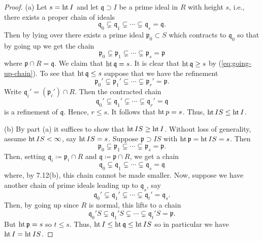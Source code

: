 \begin{proof}
(a) Let $s=\operatorname{ht} I$ and let $\mathfrak{q}\supset I$ be a prime ideal in $R$
with height $s$, i.e., there exists a proper chain of ideals
\[
\mathfrak{q}_0\subsetneq\mathfrak{q}_1\subsetneq\cdots\subsetneq\mathfrak{q}_s=\mathfrak{q}.
\]
Then by lying over there exists a prime ideal $\mathfrak{p}_0\subset S$ which
contracts to $\mathfrak{q}_0$ so that by going up we get the chain
\begin{equation}
\label{eq:going-up-chain}
\mathfrak{p}_0\subsetneq\mathfrak{p}_1\subsetneq\cdots\subsetneq\mathfrak{p}_s=\mathfrak{p}
\end{equation}
where $\mathfrak{p}\cap R=\mathfrak{q}$. We claim that
$\operatorname{ht}\mathfrak{q}=s$. It is clear that $\operatorname{ht}\mathfrak{q}\geq s$ by
(\ref{eq:going-up-chain}). To see that $\operatorname{ht}\mathfrak{q}\leq s$ suppose that
we have the refinement
\[
\mathfrak{p}_0'\subsetneq\mathfrak{p}_1'\subsetneq\cdots\subsetneq\mathfrak{p}_r'=\mathfrak{p}.
\]
Write $\mathfrak{q}_i'=(\mathfrak{p}_i')\cap R$. Then the contracted chain
\[
\mathfrak{q}_0'\subsetneq\mathfrak{q}_1'\subsetneq\cdots\subsetneq\mathfrak{q}_r'=\mathfrak{q}
\]
is a refinement of $\mathfrak{q}$. Hence, $r\leq s$. It follows that $\operatorname{ht}
p=s$. Thus, $\operatorname{ht} IS\leq\operatorname{ht} I$.

(b) By part (a) it suffices to show that $\operatorname{ht} IS\geq\operatorname{ht} I$. Without loss of
generality, assume $\operatorname{ht} IS<\infty$, say $\operatorname{ht} IS=s$. Suppose
$\mathfrak{p}\supset IS$ with $\operatorname{ht}\mathfrak{p}=\operatorname{ht} IS=s$. Then
\[
\mathfrak{p}_0\subsetneq\mathfrak{p}_1\subsetneq\cdots\subsetneq\mathfrak{p}_s=\mathfrak{p}.
\]
Then, setting $\mathfrak{q}_i\coloneqq\mathfrak{p}_i\cap R$ and
$\mathfrak{q}\coloneqq\mathfrak{p}\cap R$, we get a chain
\[
\mathfrak{q}_0\subsetneq\mathfrak{q}_1\subsetneq\cdots\subsetneq\mathfrak{q}_s=\mathfrak{q}
\]
where, by 7.12(b), this chain cannot be made smaller. Now, suppose
we have another chain of prime ideals leading up to $\mathfrak{q}_s$, say
\[
\mathfrak{q}_0'\subsetneq\mathfrak{q}_1'\subsetneq\cdots\subsetneq\mathfrak{q}_t'=\mathfrak{q}_s.
\]
Then, by going up since $R$ is normal, this lifts to a chain
\[
\mathfrak{q}_0'S\subsetneq\mathfrak{q}_1'S\subsetneq
\cdots
\subsetneq\mathfrak{q}_t'S=\mathfrak{p}.
\]
But $\operatorname{ht}\mathfrak{p}=s$ so $t\leq s$. Thus, $\operatorname{ht}
I\leq\operatorname{ht}\mathfrak{q}\leq\operatorname{ht} IS$ so in particular we have $\operatorname{ht} I=\operatorname{ht} IS$.
\end{proof}

